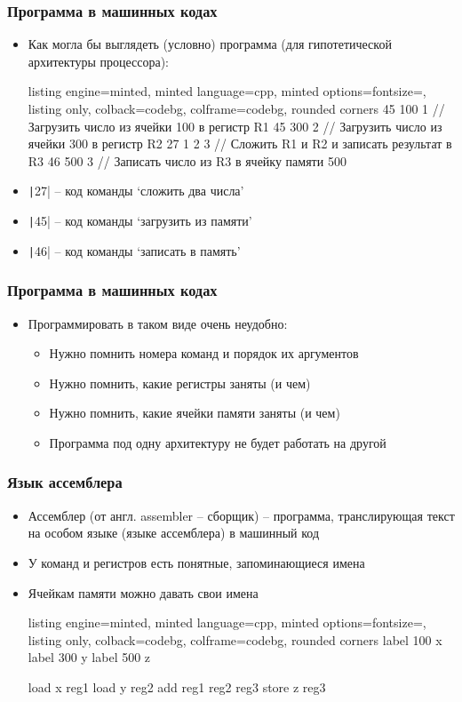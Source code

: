 \documentclass[10pt]{beamer}
\begin{document}
\begin{frame}[fragile]
\frametitle{Программа в машинных кодах}
\begin{itemize}
\item Как могла бы выглядеть (условно) программа (для гипотетической архитектуры процессора):
\pause
{}
\begin{tcblisting}{listing engine=minted, minted language=cpp, minted options={fontsize=\scriptsize}, listing only, colback=codebg, colframe=codebg, rounded corners}
45 100 1    // Загрузить число из ячейки 100 в регистр R1
45 300 2    // Загрузить число из ячейки 300 в регистр R2
27 1 2 3    // Сложить R1 и R2 и записать результат в R3
46 500 3    // Записать число из R3 в ячейку памяти 500
\end{tcblisting}
\pause
{}
\item \texttt|27| -- код команды `сложить два числа'
\item \texttt|45| -- код команды `загрузить из памяти'
\item \texttt|46| -- код команды `записать в память'
\end{itemize}
\end{frame}

\begin{frame}[fragile]
\frametitle{Программа в машинных кодах}
\begin{itemize}
\item Программировать в таком виде очень неудобно:
\pause
\begin{itemize}
\item Нужно помнить номера команд и порядок их аргументов
\pause
\item Нужно помнить, какие регистры заняты (и чем)
\pause
\item Нужно помнить, какие ячейки памяти заняты (и чем)
\pause
\item Программа под одну архитектуру не будет работать на другой
\end{itemize}
\end{itemize}
\end{frame}

\begin{frame}[fragile]
\frametitle{Язык ассемблера}
\begin{itemize}
\item Ассемблер (от англ. assembler -- сборщик) -- программа, транслирующая текст на особом языке (языке ассемблера) в машинный код
\pause
\item У команд и регистров есть понятные, запоминающиеся имена
\pause
\item Ячейкам памяти можно давать свои имена
\pause
{}
\begin{tcblisting}{listing engine=minted, minted language=cpp, minted options={fontsize=\scriptsize}, listing only, colback=codebg, colframe=codebg, rounded corners}
label 100 x
label 300 y
label 500 z

load x reg1
load y reg2
add reg1 reg2 reg3
store z reg3
\end{tcblisting}
\end{itemize}
\end{frame}
\end{document}
